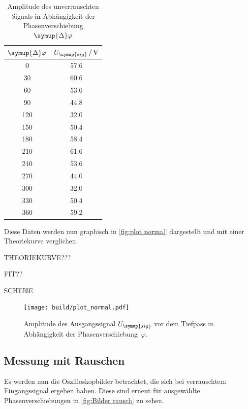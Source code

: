 \begin{table} [H]
  \centering
  \caption{Amplitude des unverrauschten Signals in Abhängigkeit der Phasenverschiebung $\symup{\Delta}\varphi$}
  \label{tab:unverrauscht}
  \begin{tabular}{S[table-format=3.0] S[table-format=2.1]}
    \toprule
    {$\symup{\Delta}\varphi$} & {$U_{\symup{sig}}\,/\,\unit{\volt}$} \\
    	  & 57.6 \\
    30	& 60.6 \\
    60	& 53.6 \\
    90	& 44.8 \\
    120	& 32.0 \\
    150	& 50.4 \\
    180	& 58.4 \\
    210	& 61.6 \\
    240	& 53.6 \\
    270	& 44.0 \\
    300	& 32.0 \\
    330	& 50.4 \\
    360	& 59.2 \\
    \bottomrule
  \end{tabular}
\end{table}

Diese Daten werden nun graphisch in \autoref{fig:plot normal} dargestellt und mit einer Theoriekurve verglichen.

THEORIEKURVE???

FIT??

SCHEIßE

\begin{figure} [H]
  \centering
  \texttt{[image: build/plot\_normal.pdf]}
  \caption{Amplitude des Ausgangssignal $U_{\symup{sig}}$ vor dem Tiefpass in Abhängigkeit der Phasenverschiebung~$\varphi$.}
  \label{fig:plot normal}
\end{figure}

\subsection{Messung mit Rauschen}
\label{sec:mit rauschen}

Es werden nun die Oszilloskopbilder betrachtet, die sich bei verrauschtem Eingangssignal ergeben haben.
Diese sind erneut für ausgewählte Phasenverschiebungen in \autoref{fig:Bilder rausch} zu sehen.

